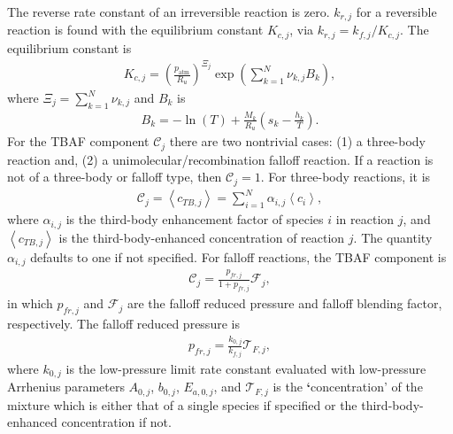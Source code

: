 \documentclass[letterpaper,10pt,english]{sphinxmanual}
\begin{document}
The reverse rate constant of an irreversible reaction is zero.
\(k_{r,j}\) for a reversible reaction is found with the equilibrium constant \(K_{c,j}\), via \(k_{r,j} = k_{f,j}/K_{c,j}\).
The equilibrium constant is
\begin{equation}\label{equation:combustion:combustion:7}
\begin{split}K_{c,j} = \left(\frac{p_\text{atm}}{R_u}\right)^{\Xi_j}\exp\left(\sum_{k=1}^{N}\nu_{k,j}B_k\right),\end{split}
\end{equation}
where \(\Xi_j=\sum_{k=1}^{N}\nu_{k,j}\) and \(B_k\) is
\begin{equation}\label{equation:combustion:combustion:8}
\begin{split}B_k = -\ln(T) + \frac{M_k}{R_u}\left(s_k - \frac{h_k}{T}\right).\end{split}
\end{equation}
For the TBAF component \(\mathcal{C}_j\) there are two nontrivial cases: (1) a three-body reaction and, (2) a unimolecular/recombination falloff reaction.
If a reaction is not of a three-body or falloff type, then \(\mathcal{C}_j = 1\).
For three-body reactions, it is
\begin{equation}\label{equation:combustion:combustion:9}
\begin{split}\mathcal{C}_j = \left\langle c_{TB,j}\right\rangle = \sum_{i=1}^{N}\alpha_{i,j}\left\langle c_i\right\rangle,\end{split}
\end{equation}
where \(\alpha_{i,j}\) is the third-body enhancement factor of species \(i\) in reaction \(j\), and \(\left\langle c_{TB,j}\right\rangle\) is the third-body-enhanced concentration of reaction \(j\).
The quantity \(\alpha_{i,j}\) defaults to one if not specified.
For falloff reactions, the TBAF component is
\begin{equation}\label{equation:combustion:combustion:10}
\begin{split}\mathcal{C}_j = \frac{p_{fr,j}}{1 + p_{fr,j}}\mathcal{F}_j,\end{split}
\end{equation}
in which \(p_{fr,j}\) and \(\mathcal{F}_j\) are the falloff reduced pressure and falloff blending factor, respectively.
The falloff reduced pressure is
\begin{equation}\label{equation:combustion:combustion:11}
\begin{split}p_{fr,j} = \frac{k_{0,j}}{k_{f,j}}\mathcal{T}_{F,j},\end{split}
\end{equation}
where \(k_{0,j}\) is the low-pressure limit rate constant evaluated with low-pressure Arrhenius parameters \(A_{0,j}\), \(b_{0,j}\), \(E_{a,0,j}\), and \(\mathcal{T}_{F,j}\) is the {\color{red}\bfseries{}{}`}concentration’ of the mixture
which is either that of a single species if specified or the third-body-enhanced concentration if not.
\end{document}
